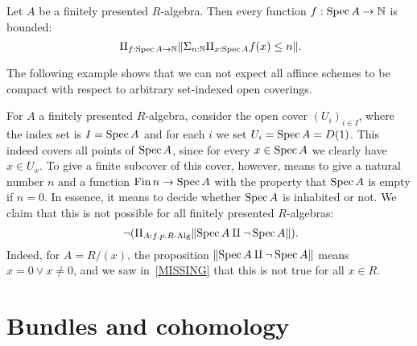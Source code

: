 \documentclass{zariski}
\begin{document}
\begin{axiom}[bound]%
  \label{bound}
  Let $A$ be a finitely presented $R$-algebra.
  Then every function $f : \operatorname{Spec} A \to \mathbb{N}$ is bounded:
  \[ \Pi_{f : \Spec A \to \N} \propTrunc{\Sigma_{n : \N} \Pi_{x : \Spec A} f(x) \le n}
     \rlap{.} \]
\end{axiom}

The following example shows that we can not expect all affince schemes
to be compact with respect to arbitrary set-indexed open coverings.

\begin{example}
  For $A$ a finitely presented $R$-algebra,
  consider the open cover ${(U_i)}_{i \in I}$,
  where the index set is $I = \operatorname{Spec} A$
  and for each $i$ we set $U_i = \operatorname{Spec} A = D(1)$.
  This indeed covers all points of $\operatorname{Spec} A$,
  since for every $x \in \operatorname{Spec} A$ we clearly have $x \in U_x$.
  To give a finite subcover of this cover, however,
  means to give a natural number $n$ and a function $\operatorname{Fin} n \to \operatorname{Spec} A$
  with the property that $\operatorname{Spec} A$ is empty if $n = 0$.
  In essence, it means to decide whether $\operatorname{Spec} A$ is inhabited or not.
  We claim that this is not possible for all finitely presented $R$-algebras:
  \[ \lnot (\Pi_{A : f.p. R\text{-Alg}} \propTrunc{\Spec A \amalg \lnot \Spec A} )
     \rlap{.} \]
  Indeed, for $A = R/(x)$,
  the proposition $\lVert \operatorname{Spec} A \amalg \lnot \operatorname{Spec} A \rVert$
  means $x = 0 \lor x \neq 0$,
  and we saw in~\ref{MISSING} that this is not true for all $x \in R$.
\end{example}


\section{Bundles and cohomology}

\end{document}
